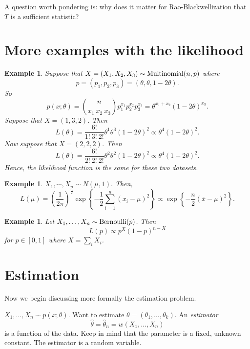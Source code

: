 \documentclass[twoside,12pt]{article}
\newtheorem{example}[theorem]{Example}
\begin{document}
A question worth pondering is: why does it matter for Rao-Blackwellization that $T$ is a sufficient statistic?

\section{More examples with the likelihood}

\begin{example}
Suppose that
$X=(X_1, X_2, X_3)\sim {\rm Multinomial}(n,p)$
where
$$
p= (p_1,p_2,p_3) = (\theta,\theta,1-2\theta).
$$
So
$$
p(x;\theta) = \binom{n}{x_1\ x_2\ x_3} p_1^{x_1}p_2^{x_2}p_3^{x_3} = \theta^{x_1+x_2}(1-2\theta)^{x_3}.
$$
Suppose that 
$X = (1,3,2)$.
Then
$$
L(\theta)=\frac{6!}{1!\  3! \ 2!} \theta^1 \theta^3
(1-2\theta)^2 \propto \theta^4 (1-2\theta)^2.
$$
Now suppose that
$X =(2,2,2)$.
Then
$$
L(\theta)= \frac{6!}{2!\  2! \ 2!}\theta^2 \theta^2
(1-2\theta)^2 \propto \theta^4 (1-2\theta)^2.
$$
Hence, the likelihood function is the same for these two datasets.
\end{example}

\begin{example}
$X_1, \cdots, X_n \sim N(\mu, 1).$
Then,
$$
L(\mu)=\left(\frac{1}{2\pi}\right)^{\frac{n}{2}}
\exp\left\{-\frac{1}{2}\sum_{i=1}^n (x_i-\mu)^2\right\}
\propto
\exp\left\{-\frac{n}{2}(\overline{x}-\mu)^2\right\}.
$$
\end{example}


\begin{example}
Let $X_1,\ldots,X_n \sim {\rm Bernoulli}(p)$. Then
$$
L(p)\propto p^X (1-p)^{n-X}
$$
for $p\in[0,1]$
where $X = \sum_i X_i$.
\end{example}



\section{Estimation}
Now we begin discussing more formally the estimation problem.

$X_1,\ldots, X_n\sim p(x;\theta)$.
Want to estimate
$\theta = (\theta_1,\ldots, \theta_k)$.
An {\em estimator}
$$
\widehat\theta =\widehat\theta_n = w(X_1, \ldots, X_n)
$$
is a function of the data.
Keep in mind that the parameter is a fixed, unknown constant.
The estimator is a random variable.
\end{document}
